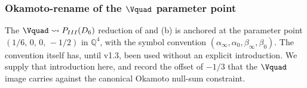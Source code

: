 %
%
%

\subsubsection*{Okamoto-rename of the $\Vquad$ parameter point}
\label{sssec:okamoto-rename}

The $\Vquad \rightsquigarrow P_{III}(D_6)$ reduction of
 and (b) is anchored at the
parameter point $(1/6,\,0,\,0,\,-1/2)$ in $\mathbb{Q}^4$, with
the symbol convention $(\alpha_\infty, \alpha_0, \beta_\infty,
\beta_0)$. The convention itself has, until v1.3, been used
without an explicit introduction. We supply that introduction
here, and record the offset of $-1/3$ that the $\Vquad$ image
carries against the canonical Okamoto null-sum constraint.

